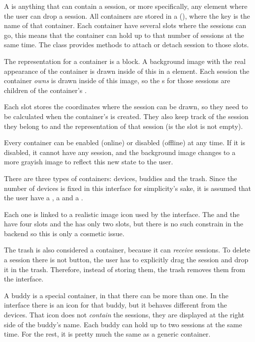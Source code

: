 A  is anything that can contain a session, or more specifically, any element where the user can drop a session.
All containers are stored in a  (), where the key is the name of that container.
Each container have several slots where the sessions can go, this means that the container can hold up to that number of sessions at the same time.
The class provides methods to attach or detach session to those slots.

The  representation for a container is a  block.
A background image with the real appearance of the container is drawn inside of this  in a  element.
Each session the container \emph{owns} is drawn inside of this image, so the s for those sessions are children of the container's .

Each slot stores the coordinates where the session can be drawn, so they need to be calculated when the container's  is created.
They also keep track of the session they belong to and the  representation of that session (is the slot is not empty).

Every container can be enabled (online) or disabled (offline) at any time.
If it is disabled, it cannot have any session, and the background image changes to a more grayish image to reflect this new state to the user.

There are three types of containers: devices, buddies and the trash.
Since the number of devices is fixed in this interface for simplicity's sake, it is assumed that the user have a , a  and a .

Each one is linked to a realistic image icon used by the interface.
The  and the  have four slots and the  has only two slots, but there is no such constrain in the backend so this is only a cosmetic issue.

The trash is also considered a container, because it can \emph{receive} sessions.
To delete a session there is not button, the user has to explicitly drag the session and drop it in the trash.
Therefore, instead of storing them, the trash removes them from the interface.

A buddy is a special container, in that there can be more than one.
In the interface there is an icon for that buddy, but it behaves different from the devices.
That icon does not \emph{contain} the sessions, they are displayed at the right side of the buddy's name.
Each buddy can hold up to two sessions at the same time.
For the rest, it is pretty much the same as a generic container.

